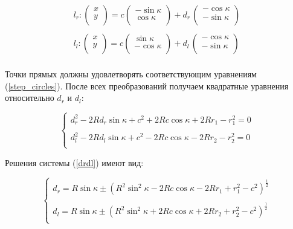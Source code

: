 \begin{equation}
\begin{array}{c}
l_r:
\left( \begin{array}{c}
x\\
y\\
\end{array}\right) = c \left(\begin{array}{r}
-\sin{\kappa}\\
\cos{\kappa}\\
\end{array}\right)+d_r\,\left(\begin{array}{r}
-\cos{\kappa}\\
-\sin{\kappa}\\
\end{array}\right)\\
\\
l_l:
\left( \begin{array}{c}
x\\
y\\
\end{array}\right) = c \left(\begin{array}{r}
\sin{\kappa}\\
-\cos{\kappa}\\
\end{array}\right)+d_l\,\left(\begin{array}{r}
-\cos{\kappa}\\
-\sin{\kappa}\\
\end{array}\right)\\
\end{array}
\end{equation}

Точки прямых должны удовлетворять соответствующим уравнениям (\ref{step_circles}). После всех преобразований получаем квадратные уравнения относительно $d_r$ и $d_l$:

\begin{equation}
\left\{
\begin{array}{lcr}
d_r^2-2Rd_r\sin{\kappa}+c^2+2Rc\cos{\kappa}+2Rr_1-r_1^2=0\\
\\
d_l^2-2Rd_l\sin{\kappa}+c^2-2Rc\cos{\kappa}-2Rr_2-r_2^2=0\\
\end{array}
\right.
\label{drdl}
\end{equation}

Решения системы (\ref{drdl}) имеют вид:

\begin{equation}
\left\{
\begin{array}{lcr}
d_r = R\sin{\kappa}\pm(R^2\sin^2{\kappa}-2Rc\cos{\kappa}-2Rr_1+r_1^2-c^2)^{\frac{1}{2}}\\
\\
d_l = R\sin{\kappa}\pm(R^2\sin^2{\kappa}+2Rc\cos{\kappa}+2Rr_2+r_2^2-c^2)^{\frac{1}{2}}\\
\end{array}
\right.
\label{dldrsolutions}
\end{equation}

